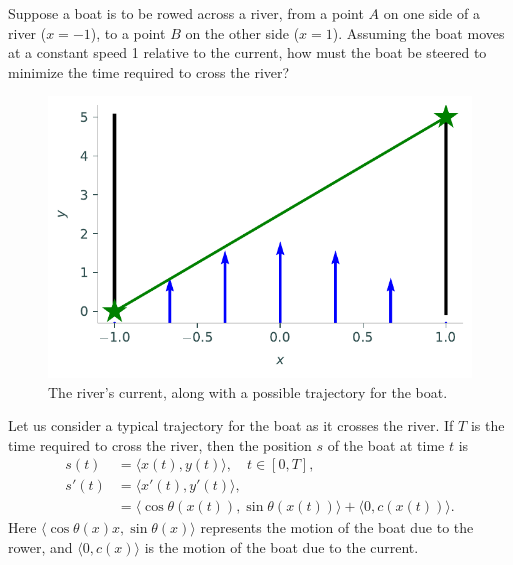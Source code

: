 \label{lab:rivercrossing}

Suppose a boat is to be rowed across a river, from a point $A$ on one side of a river ($x=-1$), to a point $B$ on the other side ($x=1$). 
Assuming the boat moves at a constant speed 1 relative to the current, how must the boat be steered to minimize the time required to cross the river? 

\begin{figure}
\centering
\includegraphics[width=\textwidth]{figures/rivercurrent.pdf}
\caption{The river's current, along with a possible trajectory for the boat.}
\label{fig:rivercrossing_current}
\end{figure}


Let us consider a typical trajectory for the boat as it crosses the river. 
If $T$ is the time required to cross the river, then the position $s$ of the boat at time $t$ is
\begin{align*}
	s(t) &= \langle x(t), y(t) \rangle, \quad t \in [0,T], \\
	s'(t) &= \langle x'(t), y'(t) \rangle, \\
	&= \langle \cos \theta(x(t)),\sin \theta(x(t)) \rangle + \langle 0, c(x(t)) \rangle.
\end{align*}
Here $\langle \cos \theta(x)x, \sin \theta(x) \rangle$ represents the motion of the boat due to the rower, and $\langle 0, c(x) \rangle$ is the motion of the boat due to the current.

